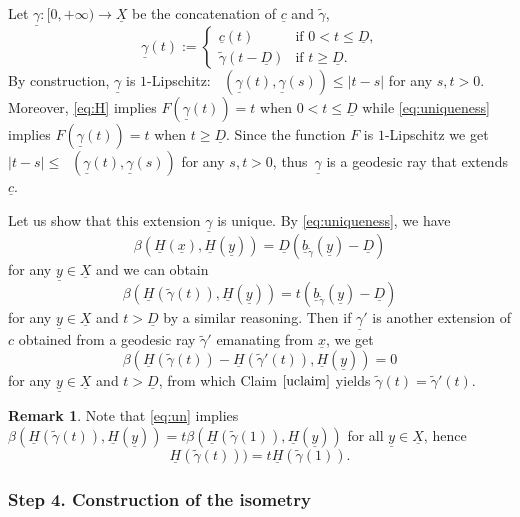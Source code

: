 \documentclass[10pt]{amsart}
\theoremstyle{plain}
\theoremstyle{definition}
\newtheorem{remark}[theorem]{Remark}
\newcommand{\dist}{\mathsf{d}}
\newcommand{\uX}{\underline{X}}
\newcommand{\ub}{\underline{b}}
\DeclareMathOperator{\udist}{\underline{\dist}}
\newcommand{\ux}{\underline{x}}
\newcommand{\uc}{\underline{c}}
\newcommand{\uD}{\underline{D}}
\newcommand{\uH}{\underline{H}}
\newcommand{\ugamma}{\underline{\gamma}}
\newcommand{\uy}{\underline{y}}
\begin{document}
Let $\ugamma:[0,+\infty)\to \uX$ be the concatenation of $\uc$ and $\tilde{\gamma}$, \ie
\[
\ugamma(t):=
\begin{cases}
\uc(t) & \text{if $0<t\le \uD$,}\\
\tilde{\gamma}(t-\uD) & \text{if $t\ge\uD$.}
\end{cases}
\]
By construction, $\ugamma$ is $1$-Lipschitz: $\udist(\ugamma(t),\ugamma(s))\le |t-s|$ for any $s,t>0$. Moreover, \eqref{eq:H} implies $F(\ugamma(t))=t$ when $0<t\le \uD$ while \eqref{eq:uniqueness} implies $F(\ugamma(t))=t$ when $t\ge \uD$. Since the function $F$ is $1$-Lipschitz we get $|t-s| \le \udist(\ugamma(t),\ugamma(s))$ for any $s,t>0$, thus~$\ugamma$ is a geodesic ray that extends $\uc$.

Let us show that this extension $\ugamma$ is unique. By \eqref{eq:uniqueness}, we have
\begin{equation}\label{eq:un}
\beta(\uH(\ux),\uH(\uy)) = \uD(\ub_{\tilde{\gamma}}(\uy)-\uD)
\end{equation}
for any $\uy \in \uX$ and we can obtain
\begin{equation}
\beta(\uH(\tilde{\gamma}(t)),\uH(\uy)) = t(\ub_{\tilde{\gamma}}(\uy)-\uD)
\end{equation}
for any $\uy \in \uX$ and $t>\uD$ by a similar reasoning. Then if $\ugamma'$ is another extension of $c$ obtained from a geodesic ray $\tilde{\gamma}'$ emanating from $\ux$, we get
\[
\beta(\uH(\tilde{\gamma}(t))-\uH(\tilde{\gamma}'(t)),\uH(\uy)) =0
\]
for any $\uy \in \uX$ and $t>\uD$, from which Claim $\ref{uclaim}$ yields $\tilde{\gamma}(t)=\tilde{\gamma}'(t)$.

\begin{remark}
Note that \eqref{eq:un} implies $\beta(\uH(\tilde{\gamma}(t)),\uH(\uy)) = t\beta(\uH(\tilde{\gamma}(1)),\uH(\uy))$ for all $\uy \in \uX$, hence
\begin{equation}\label{eq:conicalstructure}
\uH(\tilde{\gamma}(t)))= t\uH(\tilde{\gamma}(1)).
\end{equation}
\end{remark}

\subsubsection*{Step 4. Construction of the isometry}
\end{document}
